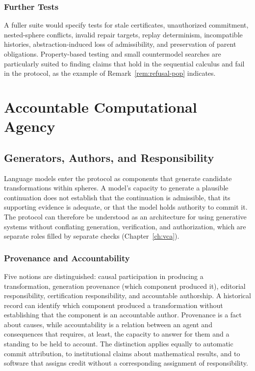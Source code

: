 \documentclass[12pt,oneside,openany]{book}
\theoremstyle{spherepop}
\theoremstyle{remarkstyle}
\begin{document}
\section{Further Tests}

A fuller suite would specify tests for stale certificates, unauthorized commitment, nested-sphere conflicts, invalid repair targets, replay determinism, incompatible histories, abstraction-induced loss of admissibility, and preservation of parent obligations. Property-based testing and small countermodel searches are particularly suited to finding claims that hold in the sequential calculus and fail in the protocol, as the example of Remark~\ref{rem:refusal-pop} indicates.

\part{Accountable Computational Agency}
\label{part:agency}

\chapter{Generators, Authors, and Responsibility}
\label{ch:agency}

Language models enter the protocol as components that generate candidate transformations within spheres. A model's capacity to generate a plausible continuation does not establish that the continuation is admissible, that its supporting evidence is adequate, or that the model holds authority to commit it. The protocol can therefore be understood as an architecture for using generative systems without conflating generation, verification, and authorization, which are separate roles filled by separate checks (Chapter~\ref{ch:vca}).

\section{Provenance and Accountability}

Five notions are distinguished: causal participation in producing a transformation, generation provenance (which component produced it), editorial responsibility, certification responsibility, and accountable authorship. A historical record can identify which component produced a transformation without establishing that the component is an accountable author. Provenance is a fact about causes, while accountability is a relation between an agent and consequences that requires, at least, the capacity to answer for them and a standing to be held to account. The distinction applies equally to automatic commit attribution, to institutional claims about mathematical results, and to software that assigns credit without a corresponding assignment of responsibility.
\end{document}
